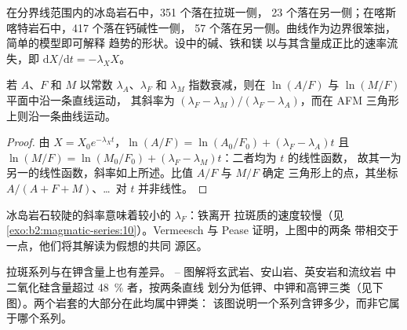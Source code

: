 \begin{omfigure}
\par{}
\end{omfigure}

在分界线范围内的冰岛岩石中，351 个落在拉斑一侧，
23 个落在另一侧；在喀斯喀特岩石中，417 个落在钙碱性一侧，
57 个落在另一侧。曲线作为边界很笨拙，简单的模型即可解释
趋势的形状。设中的碱、铁和镁
以与其含量成正比的速率流失，即 $\mathrm dX/\mathrm dt = -\lambda_X X$。

\begin{proposition}[对数比趋势]\label{prop:b2:magmatic-series:logratio}
若 $A$、$F$ 和 $M$ 以常数 $\lambda_A$、$\lambda_F$ 和
$\lambda_M$ 指数衰减，则在 $\ln(A/F)$ 与 $\ln(M/F)$ 平面中沿一条直线运动，
其斜率为 $(\lambda_F - \lambda_M)/(\lambda_F - \lambda_A)$，而在
AFM 三角形上则沿一条曲线运动。
\end{proposition}

\begin{proof}
由 $X = X_0 e^{-\lambda_X t}$，$\ln(A/F) = \ln(A_0/F_0) + (\lambda_F - \lambda_A)t$
且 $\ln(M/F) = \ln(M_0/F_0) + (\lambda_F - \lambda_M)t$：二者均为 $t$ 的线性函数，
故其一为另一的线性函数，斜率如上所述。比值 $A/F$ 与 $M/F$ 确定
三角形上的点，其坐标 $A/(A + F + M)$、\dots\ 对 $t$ 并非线性。
\end{proof}

冰岛岩石较陡的斜率意味着较小的 $\lambda_F$：铁离开
拉斑质的速度较慢（见\cref{exo:b2:magmatic-series:10}）。Vermeesch 与 Pease 证明，上图中的两条
带相交于一点，他们将其解读为假想的共同
源区。

拉斑系列与在钾含量上也有差异。
-- 图解将玄武岩、安山岩、英安岩和流纹岩
中二氧化硅含量超过 \qty{48}{\percent} 者，按两条直线
划分为低钾、中钾和高钾三类（见下图）。两个岩套的大部分在此均属中钾类：
该图说明一个系列含钾多少，而非它属于哪个系列。

